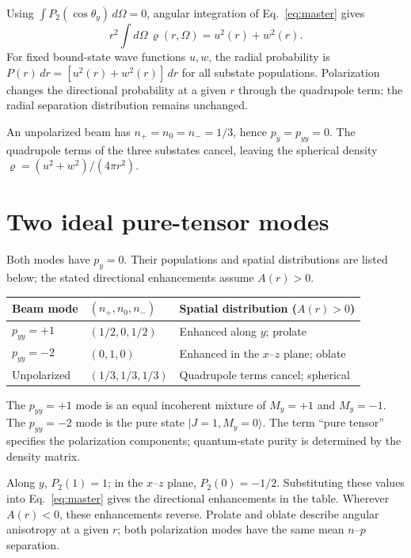 \documentclass[11pt,a4paper]{article}
\begin{document}
Using $\int P_2(\cos\theta_y)\,d\Omega=0$, angular integration of
Eq.~\eqref{eq:master} gives
\begin{equation}
r^2\int d\Omega\,\varrho(r,\Omega)=u^2(r)+w^2(r).
\label{eq:radial}
\end{equation}
For fixed bound-state wave functions $u,w$, the radial probability is
$P(r)\,dr=[u^2(r)+w^2(r)]\,dr$ for all substate populations.
Polarization changes the directional probability at a given $r$ through
the quadrupole term; the radial separation distribution remains unchanged.

An unpolarized beam has $n_+=n_0=n_-=1/3$, hence $p_y=p_{yy}=0$.
The quadrupole terms of the three substates cancel, leaving the spherical
density $\varrho=(u^2+w^2)/(4\pi r^2)$.

\section{Two ideal pure-tensor modes}

Both modes have $p_y=0$. Their populations and spatial distributions
are listed below; the stated directional enhancements assume $A(r)>0$.
\begin{center}
\begin{tabular}{>{\centering\arraybackslash}p{2.3cm}
                >{\centering\arraybackslash}p{3.4cm}
                p{7.1cm}}
\toprule
Beam mode & $(n_+,n_0,n_-)$ & Spatial distribution ($A(r)>0$)\\
\midrule
$p_{yy}=+1$ & $(1/2,0,1/2)$ & Enhanced along $y$; prolate\\
$p_{yy}=-2$ & $(0,1,0)$ & Enhanced in the $x$--$z$ plane; oblate\\
Unpolarized & $(1/3,1/3,1/3)$ & Quadrupole terms cancel; spherical\\
\bottomrule
\end{tabular}
\end{center}

The $p_{yy}=+1$ mode is an equal incoherent mixture of $M_y=+1$ and
$M_y=-1$. The $p_{yy}=-2$ mode is the pure state $|J=1,M_y=0\rangle$.
The term ``pure tensor'' specifies the polarization components;
quantum-state purity is determined by the density matrix.

Along $y$, $P_2(1)=1$; in the $x$--$z$ plane, $P_2(0)=-1/2$.
Substituting these values into Eq.~\eqref{eq:master} gives the directional
enhancements in the table. Wherever $A(r)<0$, these enhancements reverse.
Prolate and oblate describe angular anisotropy at a given $r$;
both polarization modes have the same mean $n$--$p$ separation.
\end{document}
